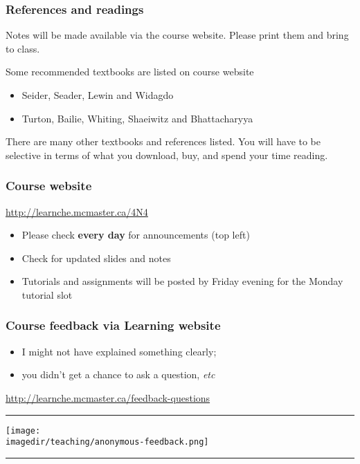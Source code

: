 \begin{frame}\frametitle{References and readings}

	Notes will be made available via the course website. Please print them and bring to class.

	\vspace{12pt}
	\vspace{12pt}
	Some recommended textbooks are listed on course website
	\begin{itemize}
		\item	Seider, Seader, Lewin and Widagdo
		\item	Turton, Bailie, Whiting, Shaeiwitz and Bhattacharyya
	\end{itemize}

	\vspace{12pt}
	There are many other textbooks and references listed. You will have to be selective in terms of what you download, buy, and spend your time reading.
\end{frame}

\begin{frame}\frametitle{Course website}
	\begin{exampleblock}{}
		\centering
		\href{http://learnche.mcmaster.ca/4N4}{http://learnche.mcmaster.ca/4N4}
	\end{exampleblock}
	\begin{itemize}
		\item	Please check \textbf{every day} for announcements {\tiny (top left)}
		\item	Check for updated slides and notes
		\item	Tutorials and assignments will be posted by Friday evening for the Monday tutorial slot
	\end{itemize}
\end{frame}

\begin{frame}\frametitle{Course feedback via Learning website}
	\begin{itemize}
		\item	I might not have explained something clearly;
		\item	you didn't get a chance to ask a question, \emph{etc}
	\end{itemize}
	\href{http://learnche.mcmaster.ca/feedback-questions}{http://learnche.mcmaster.ca/feedback-questions}
	\vspace{12pt}
	\hrule
	\begin{center}
		\texttt{[image: \\imagedir/teaching/anonymous-feedback.png]}
	\end{center}
	\hrule
\end{frame}


